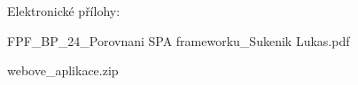 \documentclass{vdocdiplcz}
\begin{document}
\maketitlepages

\tableofcontents\clearpage

\nastavodstavec   %
\radkovani   %

\mainmatter









\renewcommand{\refname}{Seznam použité literatury}

\begingroup

\endgroup

%
\listoffigures\clearpage
%
\listoftables\clearpage






\clearpage
%
\clearpage
%
\appendix
%

  \rule{0pt}{1pt}\thispagestyle{empty}
    \par
    \noindent{\Huge\bfseries\scshape\appendixpagename}
    \vspace{7em}
    

\begin{citemize}
	\item Elektronické přílohy:
	\begin{citemize}
		\item FPF\_BP\_24\_Porovnani SPA frameworku\_Sukenik Lukas.pdf
		\item webove\_aplikace.zip
	\end{citemize}
\end{citemize}
    \rule{0pt}{1pt}

  \clearpage

%
\end{document}
